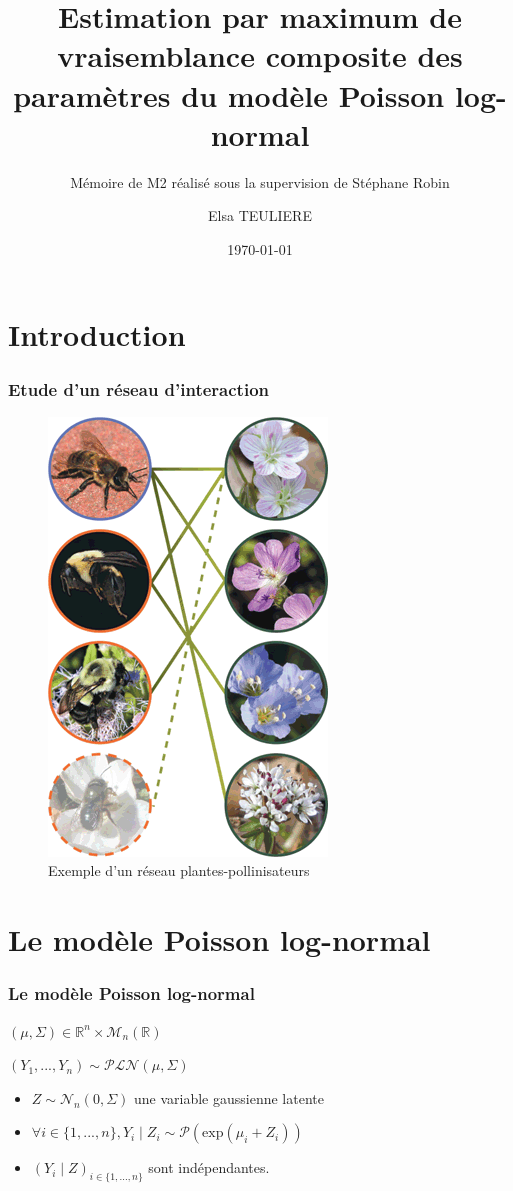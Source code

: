 \documentclass[11pt,table]{beamer}
\title %
{Estimation par maximum de vraisemblance composite des paramètres du modèle Poisson log-normal}
\subtitle{Mémoire de M2 réalisé sous la supervision de Stéphane Robin}
\author[Elsa TEULIERE] %
{Elsa TEULIERE}
\institute[UPMC] %
{
  Master 2 Probabilités et modèles aléatoires}
\date[\today] %
{\today}
\begin{document}
\begin{frame}
  \titlepage

\end{frame}
\section*{Introduction}

\begin{frame}
\frametitle{Etude d'un réseau d'interaction}
\begin{figure}
\includegraphics[scale=0.3]{Plant_polinisator.png}
\caption{Exemple d'un réseau plantes-pollinisateurs} 
\end{figure}
\end{frame}

\section{Le modèle Poisson log-normal}
\begin{frame}
\frametitle{Le modèle Poisson log-normal}
$(\mu, \Sigma) \in \mathbb{R}^n \times \mathcal{M}_n(\mathbb{R})$\\
\vspace{0.5cm}

$(Y_1,...,Y_n) \sim \mathcal{PLN} (\mu,\Sigma)$  \\

\begin{itemize}
\item  $Z \sim \mathcal{N}_n(0,\Sigma)$ une variable gaussienne  latente

\item$\forall i \in \{1,...,n\}, Y_i\mid Z_i \sim \mathcal{P}(\mathrm{exp}(\mu_i+Z_i))$

\item $(Y_i\mid Z )_{i \in \{1,...,n\}}$ sont indépendantes.
\end{itemize}
\end{frame}
\end{document}

